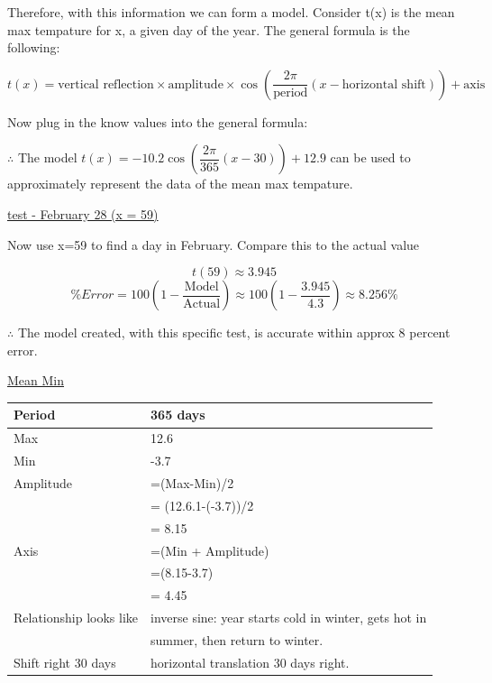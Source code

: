 \documentclass[12pt]{book}
\begin{document}
\begin{enumerate}
\newpage

\vspace{0.3cm}
Therefore, with this information we can form a model. 
Consider t(x) is the mean max tempature for x, a given day of the year. 
The general formula is the following:

$$t(x) = \text{vertical reflection} \times \text{amplitude} \times \cos\left( \dfrac{2\pi}{\text{period}}  (x - \text{horizontal shift}) \right) + \text{axis}$$

\begin{center}
    Now plug in the know values into the general formula:
\end{center}

$\therefore$ The model $\boxed{t(x) = -10.2\cos\left( \dfrac{2\pi}{365} (x - 30) \right) + 12.9}$ can be used to approximately represent the data of the mean max tempature.

\vspace{0.3cm}
\underline{test - February 28 (x = 59)}

Now use x=59 to find a day in February. Compare this to the actual value

$$t(59) \approx 3.945$$
\vspace{0.1cm}
$$\% Error = 100\left(1-\dfrac{\text{Model}}{\text{Actual}}\right) \approx 100\left(1-\dfrac{3.945}{4.3}\right) \approx \boxed{8.256\%}$$

\begin{center}
    $\therefore$ The model created, with this specific test, is accurate within approx 8 percent error.
\end{center}

\vspace{0.7cm}
\underline{Mean Min}

\vspace{0.3cm}
\begin{tabular}{|l|l|}
    \hline
    Period & 365 days \\
    \hline
    Max & 12.6 \\
    \hline
    Min & -3.7 \\
    \hline
    Amplitude & =(Max-Min)/2\\
    & = (12.6.1-(-3.7))/2 \\
    & = 8.15 \\
    \hline
    Axis & =(Min + Amplitude)\\
    & =(8.15-3.7) \\
    & = 4.45 \\
    \hline
    Relationship looks like & inverse sine: year starts cold in winter, gets hot in \\
    & summer, then return to winter. \\
    \hline
    Shift right 30 days & horizontal translation 30 days right. \\
    \hline
\end{tabular}


\end{enumerate}
\end{document}
